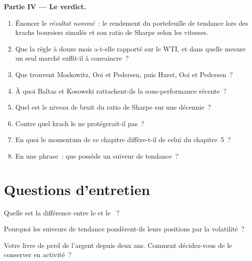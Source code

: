 \begin{problem}
\medskip\noindent\textbf{Partie IV --- Le verdict.}
\begin{enumerate}[resume]
\item Énoncer le \emph{résultat nommé}~: le rendement du portefeuille de tendance lors des krachs boursiers simulés et son ratio de Sharpe selon les vitesses.
\item Que la règle à douze mois a-t-elle rapporté sur le WTI, et dans quelle mesure un seul marché suffit-il à convaincre~?
\item Que trouvent Moskowitz, Ooi et Pedersen, puis Hurst, Ooi et Pedersen~?
\item À quoi Baltas et Kosowski rattachent-ils la sous-performance récente~?
\item Quel est le niveau de bruit du ratio de Sharpe sur une décennie~?
\item Contre quel krach le  ne protégerait-il pas~?
\item En quoi le momentum de ce chapitre diffère-t-il de celui du chapitre~5~?
\item En une phrase~: que possède un suiveur de tendance~?
\end{enumerate}
\end{problem}

\section{Questions d'entretien}

\begin{interviewq}\label{iq:s1:trend-following:1}
Quelle est la différence entre le  et le ~?
\end{interviewq}

\begin{interviewq}\label{iq:s1:trend-following:2}
Pourquoi les suiveurs de tendance pondèrent-ils leurs positions par la volatilité~?
\end{interviewq}

\begin{interviewq}\label{iq:s1:trend-following:3}
Votre livre de  perd de l'argent depuis deux ans. Comment décidez-vous de le conserver en activité~?
\end{interviewq}

